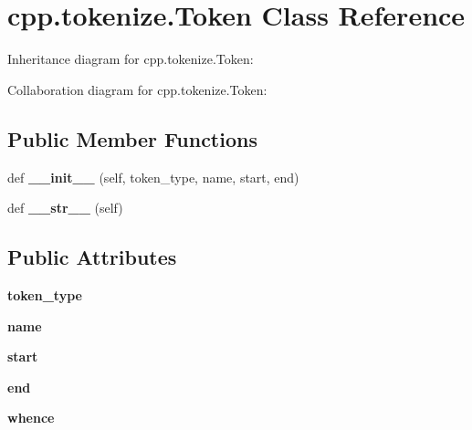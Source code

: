 \hypertarget{classcpp_1_1tokenize_1_1Token}{}\section{cpp.\+tokenize.\+Token Class Reference}
\label{classcpp_1_1tokenize_1_1Token}


Inheritance diagram for cpp.\+tokenize.\+Token\+:


Collaboration diagram for cpp.\+tokenize.\+Token\+:
\subsection*{Public Member Functions}
\begin{DoxyCompactItemize}
\item 
\mbox{\label{classcpp_1_1tokenize_1_1Token_a7da7659a5a6c61d0f4b8590cf96e19fd}} 
def {\bfseries \+\_\+\+\_\+init\+\_\+\+\_\+} (self, token\+\_\+type, name, start, end)
\item 
\mbox{\label{classcpp_1_1tokenize_1_1Token_a98e024051039637a18601fcbb0232cc2}} 
def {\bfseries \+\_\+\+\_\+str\+\_\+\+\_\+} (self)
\end{DoxyCompactItemize}
\subsection*{Public Attributes}
\begin{DoxyCompactItemize}
\item 
\mbox{\label{classcpp_1_1tokenize_1_1Token_a60c6e5120f3947885f10788ceb69a660}} 
{\bfseries token\+\_\+type}
\item 
\mbox{\label{classcpp_1_1tokenize_1_1Token_a90859dd16bde71bc38f717f5119e63b9}} 
{\bfseries name}
\item 
\mbox{\label{classcpp_1_1tokenize_1_1Token_a8ec48e348ff29901857cb21553da464b}} 
{\bfseries start}
\item 
\mbox{\label{classcpp_1_1tokenize_1_1Token_a9935738c382352eca19834c2533715db}} 
{\bfseries end}
\item 
\mbox{\label{classcpp_1_1tokenize_1_1Token_a9d3a8011707ede6be85987d74f88848d}} 
{\bfseries whence}
\end{DoxyCompactItemize}


